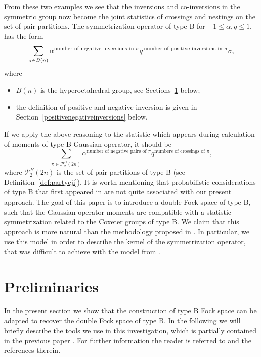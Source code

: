 \documentclass[pdftex]{sigma}
\numberwithin{equation}{section}
\def\PB{\mathcal{P}^{B}}
\newcommand{\q}{q}
\newcommand{\s}{\alpha}%
\begin{document}
From these two examples we see that
the inversions and co-inversions in the symmetric group now become
the joint statistics of crossings and nestings on the set of pair partitions.
The symmetrization operator of type B for $ -1\leq \alpha, q \leq 1$, has the form
\begin{align*}
\sum_{\sigma \in B(n)}\s^{\text{number of negative inversions in }\sigma}
\q^{\text{\,number of positive inversions in }\sigma}\sigma,
\end{align*}
where \begin{itemize}\itemsep=0pt
	\item $B(n)$ is the hyperoctahedral group, see Sections~\ref{sec:preliminaries} below;
	\item the definition of positive and negative inversion is given in Section~\ref{positivenegativeinversions} below.
\end{itemize}
If we apply the above reasoning to the statistic which appears during calculation of moments of type-B Gaussian operator, it should be
\[
\sum_{\pi\in\PB_{2}(2n)} \alpha^{\text{number of negative pairs of }\pi}q^{\text{numbers of crossings of }\pi},
\]
where $\PB_{2}(2n)$ is the set of pair partitions of type B (see Definition~\ref{def:partycji}).
It is worth mentioning that probabilistic considerations of type B that first appeared in \cite[Corollary~3.9\,(2)]{BozejkoEjsmontHasebe2015} are not quite associated with our present approach.
The goal of this paper is to introduce a double Fock space of type B, such that the Gaussian operator moments are compatible with a statistic symmetrization related to the Coxeter groups of type B. We claim that this approach is more natural than the methodology proposed in \cite{BozejkoEjsmontHasebe2015}.
In particular, we use this model in order to describe the kernel of the symmetrization operator, that was difficult to achieve with the model from \cite{BozejkoEjsmontHasebe2015}.

\section{Preliminaries }
\label{sec:preliminaries}
In the present section we show that the construction of type B Fock space \cite{BozejkoEjsmontHasebe2015} can be adapted to recover the
double Fock space of type B.
In the following we will briefly describe the tools we use in this investigation,
which is partially contained in the previous paper \cite{BozejkoEjsmontHasebe2015}.
For further information the reader is referred to \cite{BozejkoEjsmontHasebe2015} and the references therein.
\end{document}
